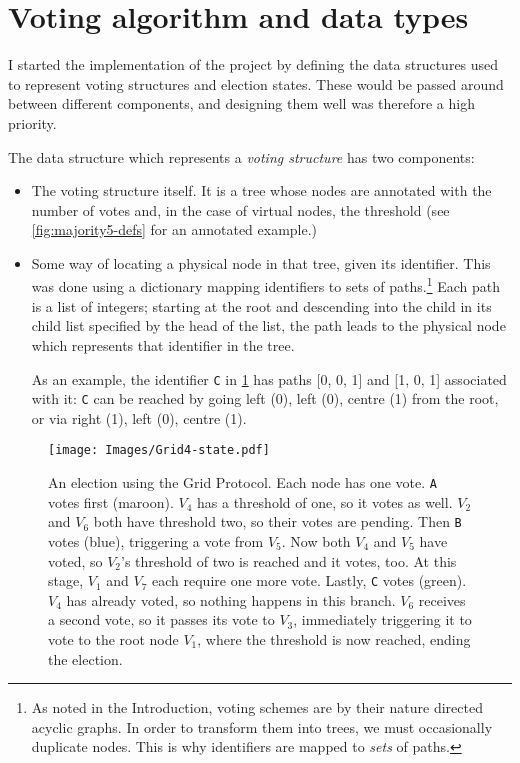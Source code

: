 \documentclass[11pt,chapterprefix=true,toc=bibliography,numbers=noendperiod,
               footnotes=multiple,twoside]{scrreprt}
\begin{document}

\section{Voting algorithm and data types\label{sc:voting-algo}}

I started the implementation of the project by defining the data structures used to represent voting structures and election states. These would be passed around between different components, and designing them well was therefore a high priority.

The data structure which represents a \emph{voting structure} has two components:

\begin{itemize}
    \item The voting structure itself. It is a tree whose nodes are annotated with the number of votes and, in the case of virtual nodes, the threshold (see \cref{fig:majority5-defs} for an annotated example.)
    \item Some way of locating a physical node in that tree, given its identifier. This was done using a dictionary mapping identifiers to sets of paths.\footnote{As noted in the Introduction, voting schemes are by their nature directed acyclic graphs. In order to transform them into trees, we must occasionally duplicate nodes. This is why identifiers are mapped to \emph{sets} of paths.} Each path is a list of integers; starting at the root and descending into the child in its child list specified by the head of the list, the path leads to the physical node which represents that identifier in the tree.

        As an example, the identifier \texttt{C} in \cref{fig:grid4-state} has paths [0, 0, 1] and [1, 0, 1] associated with it: \texttt{C} can be reached by going left (0), left (0), centre (1) from the root, or via right (1), left (0), centre (1).
\end{itemize}

\begin{figure}[p]
    \centering
    \texttt{[image: Images/Grid4-state.pdf]}
    \caption[An election using the Grid Protocol]{An election using the Grid Protocol. Each node has one vote. \texttt{A} votes first (maroon). \(V_4\) has a threshold of one, so it votes as well. \(V_2\) and \(V_6\) both have threshold two, so their votes are pending. Then \texttt{B} votes (blue), triggering a vote from \(V_5\). Now both \(V_4\) and \(V_5\) have voted, so \(V_2\)'s threshold of two is reached and it votes, too. At this stage, \(V_1\) and \(V_7\) each require one more vote. Lastly, \texttt{C} votes (green). \(V_4\) has already voted, so nothing happens in this branch. \(V_6\) receives a second vote, so it passes its vote to \(V_3\), immediately triggering it to vote to the root node \(V_1\), where the threshold is now reached, ending the election.}
    \label{fig:grid4-state}
\end{figure}
\end{document}
